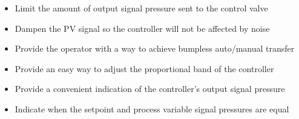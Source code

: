 \begin{itemize}
\item{} Limit the amount of output signal pressure sent to the control valve
\vskip 5pt 
\item{} Dampen the PV signal so the controller will not be affected by noise
\vskip 5pt 
\item{} Provide the operator with a way to achieve bumpless auto/manual transfer
\vskip 5pt 
\item{} Provide an easy way to adjust the proportional band of the controller
\vskip 5pt 
\item{} Provide a convenient indication of the controller's output signal pressure
\vskip 5pt 
\item{} Indicate when the setpoint and process variable signal pressures are equal
\end{itemize}





